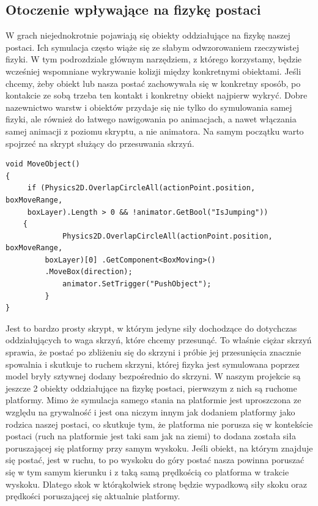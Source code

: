 \documentclass[oneside,polski,logo]{amuthesis}
\begin{document}
\subsection{Otoczenie wpływające na fizykę postaci}
W grach niejednokrotnie pojawiają się obiekty oddziałujące na fizykę naszej postaci. Ich symulacja często wiąże się ze słabym odwzorowaniem rzeczywistej fizyki. W tym podrozdziale głównym narzędziem, z którego korzystamy, będzie wcześniej wspomniane wykrywanie kolizji między konkretnymi obiektami. Jeśli chcemy, żeby obiekt lub nasza postać zachowywała się w konkretny sposób, po kontakcie ze sobą trzeba ten kontakt i konkretny obiekt najpierw wykryć. Dobre nazewnictwo warstw i obiektów przydaje się nie tylko do symulowania samej fizyki, ale również do łatwego nawigowania po animacjach, a nawet włączania samej animacji z poziomu skryptu, a nie animatora. Na samym początku warto spojrzeć na skrypt służący do przesuwania skrzyń.


\begin{lstlisting}[breaklines=true,
language={[Sharp]C},
rulecolor=\color{blue!80!black},
caption={Fragment klasy \texttt{PlayerMovement.cs}}
]
void MoveObject()
{
	 if (Physics2D.OverlapCircleAll(actionPoint.position, boxMoveRange, 
	 boxLayer).Length > 0 && !animator.GetBool("IsJumping"))
	{
           	 Physics2D.OverlapCircleAll(actionPoint.position, boxMoveRange,
		 boxLayer)[0] .GetComponent<BoxMoving>()
		 .MoveBox(direction);
           	 animator.SetTrigger("PushObject");
      	 }
}
\end{lstlisting}

Jest to bardzo prosty skrypt, w którym jedyne siły dochodzące do dotychczas oddziałujących to waga skrzyń, które chcemy przesunąć. To właśnie ciężar skrzyń sprawia, że postać po zbliżeniu się do skrzyni i próbie jej przesunięcia znacznie spowalnia i skutkuje to ruchem skrzyni, której fizyka jest symulowana poprzez model bryły sztywnej dodany bezpośrednio do skrzyni.
W naszym projekcie są jeszcze 2 obiekty oddziałujące na fizykę postaci, pierwszym z nich są ruchome platformy. Mimo że symulacja samego stania na platformie jest uproszczona ze względu na grywalność i jest ona niczym innym jak dodaniem platformy jako rodzica naszej postaci, co skutkuje tym, że platforma nie porusza się w kontekście postaci (ruch na platformie jest taki sam jak na ziemi) to dodana została siła poruszającej się platformy przy samym wyskoku. Jeśli obiekt, na którym znajduje się postać, jest w ruchu, to po wyskoku do góry postać nasza powinna poruszać się w tym samym kierunku i z taką samą prędkością co platforma w trakcie wyskoku. Dlatego skok w którąkolwiek stronę będzie wypadkową siły skoku oraz prędkości poruszającej się aktualnie platformy.
\end{document}
